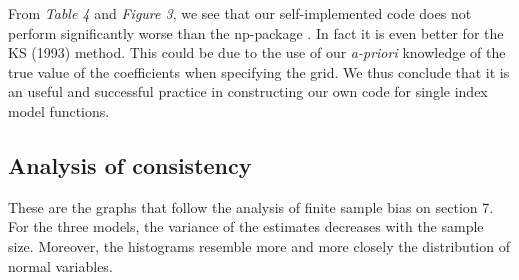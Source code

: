 

From \textit{Table 4} and \textit{Figure 3}, we see that our self-implemented code does not perform significantly worse than the np-package \cite{[28]}. In fact it is even better for the KS (1993) \cite{[12]} method. This could be due to the use of our \textit{a-priori} knowledge of the true value of the coefficients when specifying the grid. We thus conclude that it is an useful and successful practice in constructing our own code for single index model functions.

\subsection{Analysis of consistency}
These are the graphs that follow the analysis of finite sample bias on section 7. For the three models, the variance of the estimates decreases with the sample size. Moreover, the histograms resemble more and more closely the distribution of normal variables.


